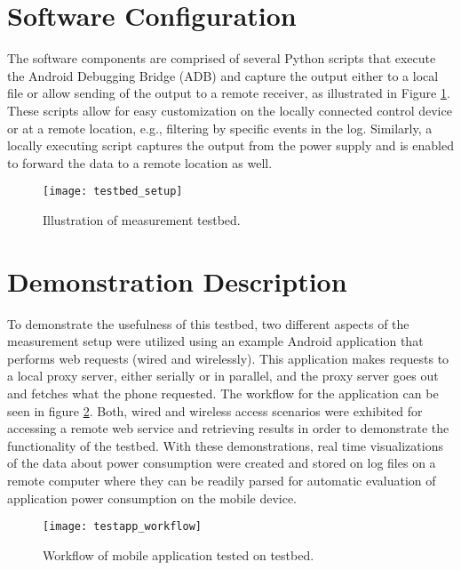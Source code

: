 \section*{Software Configuration}
The software components are comprised of several Python scripts that execute the Android Debugging Bridge (ADB) and capture the output either to a local file or allow sending of the output to a remote receiver, as illustrated in  Figure \ref{fig:testbed_setup}. These scripts allow for easy customization on the locally connected control device or at a remote location, e.g., filtering by specific events in the log. Similarly, a locally executing script captures the output from the power supply and is enabled to forward the data to a remote location as well.

\begin{figure}
\centering
\texttt{[image: testbed\_setup]}
\caption{Illustration of measurement testbed.}
\label{fig:testbed_setup}
\end{figure}

\section*{Demonstration Description}
To demonstrate the usefulness of this testbed, two different aspects of the measurement setup were utilized using an example Android application that performs web requests (wired and wirelessly). This application makes requests to a local proxy server, either serially or in parallel, and the proxy server goes out and fetches what the phone requested.  The workflow for the application can be seen in figure \ref{fig:testapp_workflow}. Both, wired and wireless access scenarios were exhibited for accessing a remote web service and retrieving results in order to demonstrate the functionality of the testbed. With these demonstrations, real time visualizations of the data about power consumption were created and stored on log files on a remote computer where they can be readily parsed for automatic evaluation of application power consumption on the mobile device.

\begin{figure}
\centering
\texttt{[image: testapp\_workflow]}
\caption{Workflow of mobile application tested on testbed.}
\label{fig:testapp_workflow}
\end{figure}
